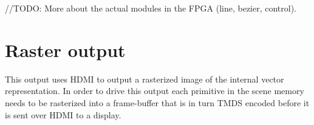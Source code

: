 //TODO: More about the actual modules in the FPGA (line, bezier, control).

\section{Raster output}

This output uses HDMI to output a rasterized image of the internal vector representation.
In order to drive this output each primitive in the scene memory needs to be rasterized into a frame-buffer that is in turn TMDS encoded before it is sent over HDMI to a display.